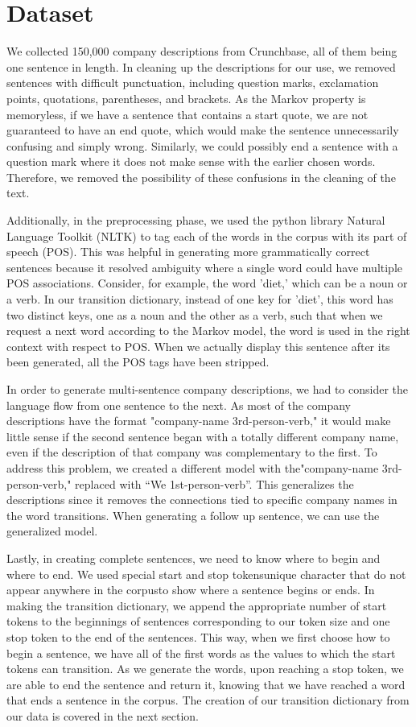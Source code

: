 \documentclass[11pt]{article}
\begin{document}
\section{Dataset}

We collected 150,000 company descriptions from Crunchbase, all of them being one sentence in length. In cleaning up the descriptions for our use, we removed sentences with difficult punctuation, including question marks, exclamation points, quotations, parentheses, and brackets. As the Markov property is memoryless, if we have a sentence that contains a start quote, we are not guaranteed to have an end quote, which would make the sentence unnecessarily confusing and simply wrong. Similarly, we could possibly end a sentence with a question mark where it does not make sense with the earlier chosen words. Therefore, we removed the possibility of these confusions in the cleaning of the text.

Additionally, in the preprocessing phase, we used the python library Natural Language Toolkit (NLTK) to tag each of the words in the corpus with its part of speech (POS). This was helpful in generating more grammatically correct sentences because it resolved ambiguity where a single word could have multiple POS associations. Consider, for example, the word 'diet,' which can be a noun or a verb. In our transition dictionary, instead of one key for 'diet', this word has two distinct keys, one as a noun and the other as a verb, such that when we request a next word according to the Markov model, the word is used in the right context with respect to POS. When we actually display this sentence after its been generated, all the POS tags have been stripped. 

In order to generate multi-sentence company descriptions, we had to consider the language flow from one sentence to the next. As most of the company descriptions have the format "company-name 3rd-person-verb," it would make little sense if the second sentence began with a totally different company name, even if the description of that company was complementary to the first. To address this problem, we created a different model with the"company-name 3rd-person-verb," replaced with ``We 1st-person-verb''. This generalizes the descriptions since it removes the connections tied to specific company names in the word transitions. When generating a follow up sentence, we can use the generalized model.

Lastly, in creating complete sentences, we need to know where to begin and where to end. We used special start and stop tokens\textemdash unique character that do not appear anywhere in the corpus\textemdash to show where a sentence begins or ends. In making the transition dictionary, we append the appropriate number of start tokens to the beginnings of sentences corresponding to our token size and one stop token to the end of the sentences. This way, when we first choose how to begin a sentence, we have all of the first words as the values to which the start tokens can transition. As we generate the words, upon reaching a stop token, we are able to end the sentence and return it, knowing that we have reached a word that ends a sentence in the corpus. The creation of our transition dictionary from our data is covered in the next section.
\end{document}
